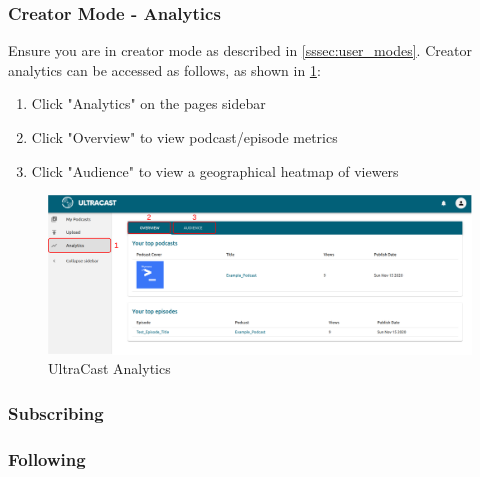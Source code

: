 \documentclass[../report.tex]{subfiles}
\begin{document}
\subsubsection{Creator Mode - Analytics}

Ensure you are in creator mode as described in \cref{sssec:user_modes}.
Creator analytics can be accessed as follows, as shown in \cref{fig:UM_edit}:
\begin{enumerate}
    \item Click "Analytics" on the pages sidebar
    \item Click "Overview" to view podcast/episode metrics
    \item Click "Audience" to view a geographical heatmap of viewers
\end{enumerate}
\begin{figure}[ht]
    \centering
    \includegraphics[width=16cm]{resources/UM_Analytics}
    \caption{UltraCast Analytics}
    \label{fig:UM_edit} 
\end{figure}

\subsubsection{Subscribing}

\subsubsection{Following}
\end{document}
